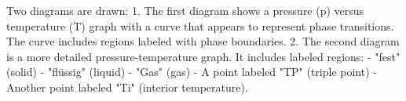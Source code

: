 Two diagrams are drawn:  
1. The first diagram shows a pressure (p) versus temperature (T) graph with a curve that appears to represent phase transitions. The curve includes regions labeled with phase boundaries.  
2. The second diagram is a more detailed pressure-temperature graph. It includes labeled regions:  
   - "fest" (solid)  
   - "flüssig" (liquid)  
   - "Gas" (gas)  
   - A point labeled "TP" (triple point)  
   - Another point labeled "Ti" (interior temperature).